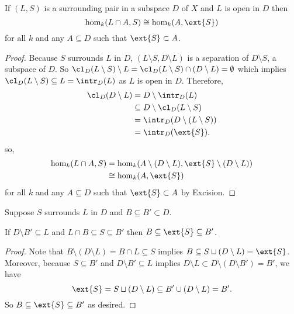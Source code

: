 
\begin{lemma}\label{lem:excision}
  If $(L, S)$ is a surrounding pair in a subspace $D$ of $X$ and $L$ is open in $D$ then
  \[ \hom_k(L\cap A, S) \cong \hom_k(A, \ext{S}) \]
  for all $k$ and any $A\subseteq D$ such that $\ext{S}\subset A$.
\end{lemma}
\begin{proof}
  Because $S$ surrounds $L$ in $D$, $(L\setminus S, D\setminus L)$ is a separation of $D\setminus S$, a subspace of $D$.
  So $\cl_D(L\setminus S)\setminus L = \cl_D(L\setminus S) \cap (D\setminus L) = \emptyset$ which implies $\cl_D(L\setminus S)\subseteq L = \intr_D(L)$ as $L$ is open in $D$.
  Therefore,
  \begin{align*}
    \cl_D(D\setminus L) &= D\setminus \intr_D(L)\\
                        &\subseteq D\setminus \cl_D(L\setminus S)\\
                        &= \intr_D(D\setminus (L\setminus S))\\
                        &= \intr_D(\ext{S}).
  \end{align*}
  so,
  \begin{align*}
    \hom_k(L\cap A, S) &= \hom_k(A\setminus (D\setminus L), \ext{S}\setminus (D\setminus L))\\
      &\cong \hom_k(A, \ext{S})
  \end{align*}
  for all $k$ and any $A\subseteq D$ such that $\ext{S}\subset A$ by Excision.
\end{proof}

%

\begin{lemma}\label{lem:surround_and_cover}
  Suppose $S$ surrounds $L$ in $D$ and $B\subseteq B'\subset D$.

  If $D\setminus B'\subseteq L$ and $L\cap B\subseteq S\subseteq B'$ then $B\subseteq \ext{S}\subseteq B'$.
\end{lemma}
\begin{proof}
  Note that $B\setminus (D\setminus L) = B\cap L\subseteq S$ implies $B\subseteq S\sqcup(D\setminus L) = \ext{S}$.
  Moreover, because $S\subseteq B'$ and $D\setminus B'\subseteq L$ implies $D\setminus L \subset D\setminus (D\setminus B') = B'$, we have
  \[ \ext{S} = S\sqcup (D\setminus L) \subseteq B'\cup (D\setminus L) = B'. \]
  So $B \subseteq \ext{S}\subseteq B'$ as desired.
\end{proof}

